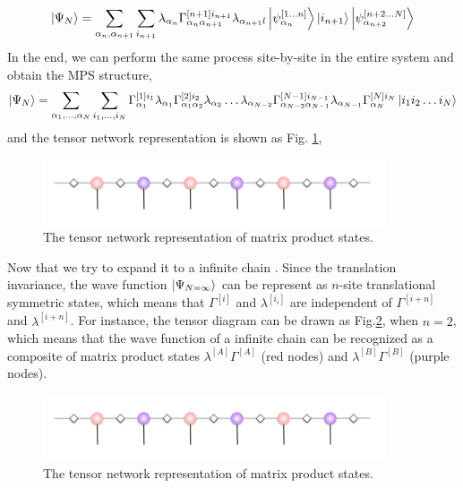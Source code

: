 \begin{align}
	\Ket{\Psi_{N}} = \sum_{\alpha_n,\alpha_{n+1}}\sum_{i_{n+1}}{\lambda_{\alpha_n} \Gamma^{[n+1] i_{n+1}}_{\alpha_n \alpha_{n+1}} \lambda_{\alpha_{n+1}l} \Ket{\psi_{\alpha_n}^{[1\dots n]}} \Ket{i_{n+1}} \Ket{\psi_{\alpha_{n+2}}^{[n+2\dots N]}} }
\end{align}
In the end, we can perform the same process site-by-site in the entire system and obtain the MPS structure,
\begin{align}
	\Ket{\Psi_N} = \sum_{\alpha_1,\dots ,\alpha_N}\sum_{i_1,\dots ,i_N}{ \Gamma^{[1] i_{1}}_{\alpha_1} \lambda_{\alpha_1} \Gamma^{[2] i_{2}}_{\alpha_1 \alpha_{2}} \lambda_{\alpha_2} \dots  \lambda_{\alpha_{N-2}} \Gamma^{[N-1] i_{N-1}}_{\alpha_{N-2} \alpha_{N-1}} \lambda_{\alpha_{N-1}} \Gamma^{[N] i_{N}}_{\alpha_{N}} \Ket{i_1 i_2 \dots i_N}}
\end{align}
and the tensor network representation is shown as Fig. \ref{fig311}, 
\begin{figure}[ht]
	\centering
	\includegraphics[width=0.90\textwidth]{figures/fig311.png}
	\caption[The tensor network representation of matrix product states]{The tensor network representation of matrix product states.}
	\label{fig311}
\end{figure}

Now that we try to expand it to a infinite chain \cite{}. Since the translation invariance, the wave function $\Ket{\Psi_{N=\infty}}$ can be represent as $n$-site translational symmetric states, which means that $\Gamma^{[i]}$ and $\lambda^{[i_{i}]}$ are independent of $\Gamma^{[i+n]}$ and $\lambda^{[i+n]}$. For instance, the tensor diagram can be drawn as Fig.\ref{fig312}, when $n=2$, which means that the wave function of a infinite chain can be recognized as a composite of matrix product states $\lambda^{[A]}\Gamma^{[A]}$ (red nodes) and $\lambda^{[B]}\Gamma^{[B]}$ (purple nodes).

\begin{figure}[ht]
	\centering
	\includegraphics[width=0.90\textwidth]{figures/fig311.png}
	\caption[The tensor network representation of matrix product states]{The tensor network representation of matrix product states.}
	\label{fig312}
\end{figure}

